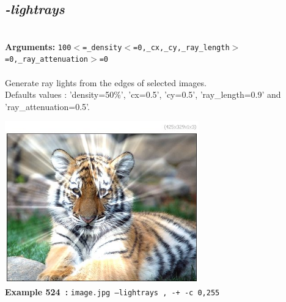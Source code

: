 \documentclass[a4paper,11pt,twoside]{book}
\begin{document}
\subsection{\emph{-lightrays} }\vspace*{-0.5em}
~\\\textbf{Arguments: } 
{\small \texttt{100$<$=\_density$<$=0,\_cx,\_cy,\_ray\_length$>$=0,\_ray\_attenuation$>$=0}}\\~\\
Generate ray lights from the edges of selected images.
~\\Defaults values : 'density=50\%', 'cx=0.5', 'cy=0.5', 'ray\_length=0.9' and 'ray\_attenuation=0.5'.
\begin{center}\includegraphics[keepaspectratio=true,height=7cm,width=\textwidth]{img/gmic_def524.jpg}\\
{\footnotesize \textbf{Example 524~:} \texttt{image.jpg --lightrays , -+ -c 0,255}}
\end{center}
\end{document}
